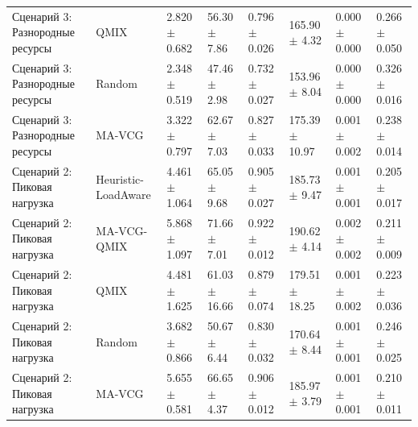 \begin{tabular}{llllllll}
Сценарий 3: Разнородные ресурсы & QMIX & 2.820 $\pm$ 0.682 & 56.30 $\pm$ 7.86 & 0.796 $\pm$ 0.026 & 165.90 $\pm$ 4.32 & 0.000 $\pm$ 0.000 & 0.266 $\pm$ 0.050 \\
Сценарий 3: Разнородные ресурсы & Random & 2.348 $\pm$ 0.519 & 47.46 $\pm$ 2.98 & 0.732 $\pm$ 0.027 & 153.96 $\pm$ 8.04 & 0.000 $\pm$ 0.000 & 0.326 $\pm$ 0.016 \\
Сценарий 3: Разнородные ресурсы & MA-VCG & 3.322 $\pm$ 0.797 & 62.67 $\pm$ 7.03 & 0.827 $\pm$ 0.033 & 175.39 $\pm$ 10.97 & 0.001 $\pm$ 0.002 & 0.238 $\pm$ 0.014 \\
Сценарий 2: Пиковая нагрузка & Heuristic-LoadAware & 4.461 $\pm$ 1.064 & 65.05 $\pm$ 9.68 & 0.905 $\pm$ 0.027 & 185.73 $\pm$ 9.47 & 0.001 $\pm$ 0.001 & 0.205 $\pm$ 0.017 \\
Сценарий 2: Пиковая нагрузка & MA-VCG-QMIX & 5.868 $\pm$ 1.097 & 71.66 $\pm$ 7.01 & 0.922 $\pm$ 0.012 & 190.62 $\pm$ 4.14 & 0.002 $\pm$ 0.002 & 0.211 $\pm$ 0.009 \\
Сценарий 2: Пиковая нагрузка & QMIX & 4.481 $\pm$ 1.625 & 61.03 $\pm$ 16.66 & 0.879 $\pm$ 0.074 & 179.51 $\pm$ 18.25 & 0.001 $\pm$ 0.002 & 0.223 $\pm$ 0.036 \\
Сценарий 2: Пиковая нагрузка & Random & 3.682 $\pm$ 0.866 & 50.67 $\pm$ 6.44 & 0.830 $\pm$ 0.032 & 170.64 $\pm$ 8.44 & 0.001 $\pm$ 0.001 & 0.246 $\pm$ 0.025 \\
Сценарий 2: Пиковая нагрузка & MA-VCG & 5.655 $\pm$ 0.581 & 66.65 $\pm$ 4.37 & 0.906 $\pm$ 0.012 & 185.97 $\pm$ 3.79 & 0.001 $\pm$ 0.001 & 0.210 $\pm$ 0.011 \\
\bottomrule
\end{tabular}

